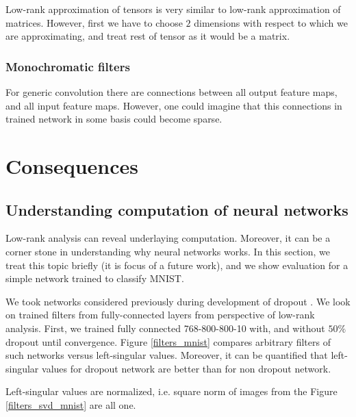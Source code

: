 \documentclass{article}
\begin{document}
Low-rank approximation of tensors is very similar to low-rank approximation of matrices.
However, first we have to choose $2$ dimensions with respect to which we are approximating, and treat
rest of tensor as it would be a matrix. 

\subsubsection{Monochromatic filters}
For generic convolution there are connections between all output feature maps, and all input feature maps.
However, one could imagine that this connections in trained network in some basis could become sparse. 

\section{Consequences}

\subsection{Understanding computation of neural networks}
Low-rank analysis can reveal underlaying computation. Moreover, it can be a corner stone
in understanding why neural networks works. In this section, we treat this topic briefly 
(it is focus of a future work), and we show evaluation for a simple network trained to classify MNIST.


We took networks considered previously during development of dropout \cite{hinton2012improving}.
We look on trained filters from fully-connected layers from perspective of low-rank analysis.
First, we trained fully connected 768-800-800-10 with, and without $50\%$ dropout until convergence.
Figure \ref{filters_mnist} compares arbitrary filters of such networks versus left-singular values. 
Moreover, it can be quantified that left-singular values for dropout network are better than for non dropout network. 


Left-singular values are normalized, i.e. square norm of images from the Figure \ref{filters_svd_mnist} are all one.
\end{document}

